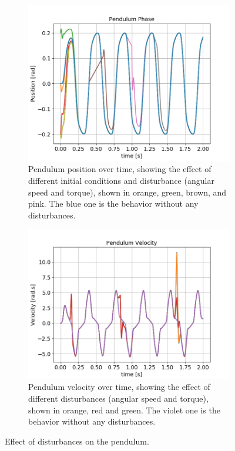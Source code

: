 \documentclass{cmc}
\begin{document}
\begin{figure}[H]
    \centering
    \begin{subfigure}[t]{0.48\textwidth}
        \centering
        \includegraphics[width=\textwidth]{3a/3a_PhaseTimev.png}
        \caption{Pendulum position over time, showing the effect of different initial conditions and disturbance (angular speed and torque), shown in orange, green, brown, and pink. The blue one is the behavior without any disturbances.}
    \end{subfigure}
    \hfill
    \begin{subfigure}[t]{0.50\textwidth}
        \centering
        \includegraphics[width=\textwidth]{3a/3a_VelocityTimeii.png}
        \caption{Pendulum velocity over time, showing the effect of different disturbances (angular speed and torque), shown in orange, red and green. The violet one is the behavior without any disturbances.}
    \end{subfigure}
    \caption{Effect of disturbances on the pendulum.}
    \label{fig:3a_VelocityTime}
\end{figure}
\end{document}
